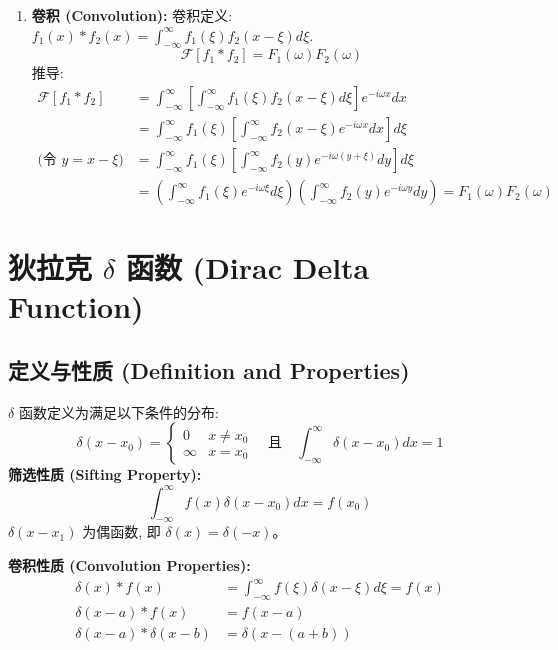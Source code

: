 \documentclass{article}
\begin{document}
\begin{enumerate}
		\item \textbf{卷积 (Convolution):}
		卷积定义: $f_1(x) * f_2(x) = \int_{-\infty}^{\infty} f_1(\xi) f_2(x-\xi) d\xi$.
		$$ \mathcal{F}[f_1 * f_2] = F_1(\omega) F_2(\omega) $$
		推导:
		\begin{align*}
			\mathcal{F}[f_1 * f_2] &= \int_{-\infty}^{\infty} \left[ \int_{-\infty}^{\infty} f_1(\xi) f_2(x-\xi) d\xi \right] e^{-i\omega x} dx \\
			&= \int_{-\infty}^{\infty} f_1(\xi) \left[ \int_{-\infty}^{\infty} f_2(x-\xi) e^{-i\omega x} dx \right] d\xi \\
			\text{(令 } y=x-\xi \text{)} &= \int_{-\infty}^{\infty} f_1(\xi) \left[ \int_{-\infty}^{\infty} f_2(y) e^{-i\omega(y+\xi)} dy \right] d\xi \\
			&= \left( \int_{-\infty}^{\infty} f_1(\xi) e^{-i\omega\xi} d\xi \right) \left( \int_{-\infty}^{\infty} f_2(y) e^{-i\omega y} dy \right) = F_1(\omega) F_2(\omega)
		\end{align*}
	\end{enumerate}
	
	\section{狄拉克 $\delta$ 函数 (Dirac Delta Function)}
	\subsection{定义与性质 (Definition and Properties)}
	$\delta$ 函数定义为满足以下条件的分布:
	$$ 
	\delta(x-x_0) = \begin{cases} 0 & x \ne x_0 \\ \infty & x = x_0 \end{cases} \quad \text{且} \quad \int_{-\infty}^{\infty} \delta(x-x_0) dx = 1 
	$$
	\textbf{筛选性质 (Sifting Property):}
	$$ 
	\int_{-\infty}^{\infty} f(x) \delta(x-x_0) dx = f(x_0) 
	$$
	$\delta(x-x_1)$ 为偶函数, 即 $\delta(x) = \delta(-x)$。
	
	\textbf{卷积性质 (Convolution Properties):}
	\begin{align*}
		\delta(x) * f(x) &= \int_{-\infty}^{\infty} f(\xi) \delta(x-\xi) d\xi = f(x) \\
		\delta(x-a) * f(x) &= f(x-a) \\
		\delta(x-a) * \delta(x-b) &= \delta(x-(a+b))
	\end{align*}
	
\end{document}
